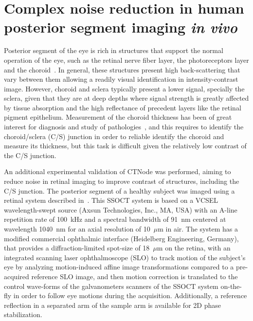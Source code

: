 \FloatBarrier

\section{Complex noise reduction in human posterior segment imaging \textit{in vivo}}

Posterior segment of the eye is rich in structures that support the normal operation of the eye, such as the retinal nerve fiber layer, the photoreceptors layer and the choroid~\cite{Drexler2015_Retinal}. In general, these structures present high back-scattering that vary between them allowing a readily visual identification in intensity-contrast image. However, choroid and sclera typically present a lower signal, specially the sclera, given that they are at deep depths where signal strength is greatly affected by tissue absorption and the high reflectance of precedent layers like the retinal pigment epithelium. Measurement of the choroid thickness has been of great interest for diagnosis and study of pathologies~\cite{Yiu2014_Characterization}, and this requires to identify the choroid/sclera (C/S) junction in order to reliable identify the choroid and measure its thickness, but this task is difficult given the relatively low contrast of the C/S junction. 

An additional experimental validation of CTNode was performed, aiming to reduce noise in retinal imaging to improve contrast of structures, including the C/S junction. The posterior segment of a healthy subject was imaged using a retinal system described in~\cite{Braaf2018_Complex}. This SSOCT system is based on a VCSEL wavelength-swept source (Axsun Technologies, Inc., MA, USA) with an A-line repetition rate of 100~kHz and a spectral bandwidth of 91~nm centered at wavelength 1040~nm for an axial resolution of 10~$\mu$m in air. The system has a modified commercial ophthalmic interface (Heidelberg Engineering, Germany), that provides a diffraction-limited spot-size of 18~$\mu$m on the retina, with an integrated scanning laser ophthalmoscope (SLO) to track motion of the subject's eye by analyzing motion-induced affine image transformations compared to a pre-acquired reference SLO image, and then motion correction is translated to the control wave-forms of the galvanometers scanners of the SSOCT system on-the-fly in order to follow eye motions during the acquisition. Additionally, a reference reflection in a separated arm of the sample arm is available for 2D phase stabilization.

